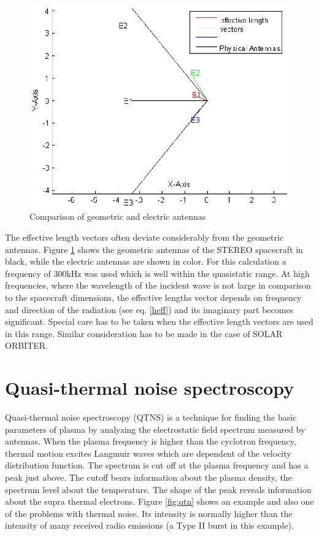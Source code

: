 \documentclass[a4paper,twocolumn]{esapub2005} %
\begin{document}
\begin{figure}
\centering
\includegraphics[width=1.0\linewidth]{paperpics/fig(2).eps}
\caption{Comparison of geometric and electric antennas} \label{fig:comparison}
\end{figure}



The effective length vectors often deviate considerably from the geometric antennas. Figure \ref{fig:comparison} shows the geometric antennas of the STEREO spacecraft in black, while the electric antennas are shown in color. For this calculation a frequency of 300kHz was used which is well within the quasistatic range. At high frequencies, where the wavelength of the incident wave is not large in comparison to the spacecraft dimensions, the effective lengths vector depends on frequency and direction of the radiation  (see eq. \ref{heff}) and its imaginary part becomes significant. Special care has to be taken when the effective length vectors are used in this range. Similar consideration has to be made in the case of SOLAR ORBITER.


\section{Quasi-thermal noise spectroscopy}
Quasi-thermal noise spectroscopy (QTNS) is a technique for finding the basic parameters of plasma by analyzing the electrostatic field spectrum measured by antennas. When the plasma frequency is higher than the cyclotron frequency, thermal motion excites Langmuir waves which are dependent of the velocity distribution function. The spectrum is cut off at the plasma frequency and has a peak just above. The cutoff bears information about the plasma density, the spectrum level about the temperature. The shape of the peak reveals information about the supra thermal electrons. Figure \ref{fig:qtn} shows an example and also one of the problems with thermal noise. Its intensity is normally higher than the intensity of many received radio emissions (a Type II burst in this example).
\end{document}
